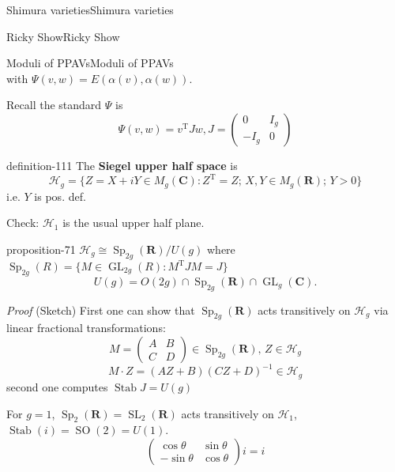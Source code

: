 \documentclass[10pt,]{book}
\makeatletter
\newcommand{\terminology}[1]{\textbf{#1}}
\renewcommand*{\proofname}{Proof}
\renewenvironment{proof}[1][\proofname]{\par
  \pushQED{\qed}%
  \normalfont \topsep6\p@\@plus6\p@\relax
  \trivlist
  \item\relax
    {\itshape
    #1\@addpunct{.}}\hspace\labelsep\ignorespaces
}{%
  \popQED\endtrivlist\@endpefalse
}
\numberwithin{equation}{section}
\newcommand{\inv}{^{-1}}
\newcommand{\RR}{\mathbf{R}}
\newcommand{\CC}{\mathbf{C}}
\newcommand{\transpose}{\mathrm{T}}
\DeclareMathOperator{\Stab}{Stab}
\DeclareMathOperator{\SL}{SL}
\DeclareMathOperator{\GL}{GL}
\DeclareMathOperator{\specialorthogonal}{SO}
\DeclareMathOperator{\Sp}{Sp}
\newcommand{\gt}{>}
\newcommand{\amp}{&}
\makeatother
\begin{document}
\begin{chapterptx}{Shimura varieties}{}{Shimura varieties}{}{}
\begin{sectionptx}{Ricky Show}{}{Ricky Show}{}{}
\begin{subsectionptx}{Moduli of PPAVs}{}{Moduli of PPAVs}{}{}
\begin{equation*}
\end{equation*}
with \(\Psi(v,w) = E(\alpha(v), \alpha(w))\).%
\par
\hypertarget{p-1127}{}%
Recall the standard \(\Psi\) is%
\begin{equation*}
\Psi (v,w) = v^\transpose J w, J = \begin{pmatrix} 0 \amp I_g \\ -I_g \amp 0\end{pmatrix}
\end{equation*}
%
\begin{definition}{}{definition-111}%
\hypertarget{p-1128}{}%
The \terminology{Siegel upper half space} is%
\begin{equation*}
\mathscr H_g = \{ Z = X+iY \in M_g(\CC) : Z^\transpose  = Z ; \, X,Y \in M_g(\RR); \, Y \gt 0\}
\end{equation*}
i.e. \(Y\) is pos. def.%
\end{definition}
\hypertarget{p-1129}{}%
Check: \(\mathscr H_1\) is the usual upper half plane.%
\begin{proposition}{}{}{proposition-71}%
\hypertarget{p-1130}{}%
\(\mathscr H_g \cong \Sp_{2g}(\RR)/U(g)\) where \(\Sp_{2g} (R) = \{ M \in \GL_{2g}(R) : M^\transpose J M = J\}\)%
\begin{equation*}
U(g) = O(2g) \cap \Sp_{2g}(\RR) \cap \GL_{g}(\CC)\text{.}
\end{equation*}
%
\end{proposition}
\begin{proof}\hypertarget{proof-115}{}
\hypertarget{p-1131}{}%
(Sketch) First one can show that \(\Sp_{2g}(\RR)\) acts transitively on \(\mathscr H_g\) via linear fractional transformations:%
\begin{equation*}
M = \begin{pmatrix} A\amp B\\ C\amp D\end{pmatrix} \in \Sp_{2g}(\RR),\, Z\in \mathscr H_g
\end{equation*}
%
\begin{equation*}
M\cdot Z = (AZ+B)(CZ+D)\inv \in \mathscr H_g
\end{equation*}
second one computes \(\Stab J = U(g)\)%
\par
\hypertarget{p-1132}{}%
For \(g= 1\), \(\Sp_2(\RR) = \SL_2(\RR)\) acts transitively on \(\mathscr H_1\), \(\Stab(i) = \specialorthogonal (2) = U(1)\).%
\begin{equation*}
\begin{pmatrix} \cos \theta\amp \sin \theta \\ - \sin \theta \amp \cos \theta \end{pmatrix} i = i

\end{equation*}
\end{proof}
\end{subsectionptx}
\end{sectionptx}
\end{chapterptx}
\end{document}
